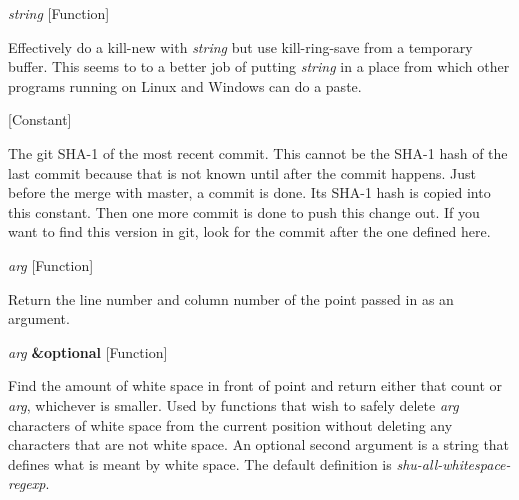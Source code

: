 \vspace{1em}
\noindent
{}
\usebox{\funcname}\emph{string}
 \hfill [Function]

\begin{doc-string}
Effectively do a kill-new with \emph{string} but use kill-ring-save from
a temporary buffer.  This seems to to a better job of putting \emph{string}
in a place from which other programs running on Linux and Windows can
do a paste.
\end{doc-string}

\vspace{1em}
\noindent
{}
\usebox{\funcname}
 \hfill [Constant]

\begin{doc-string}
The git SHA-1 of the most recent commit.  This cannot be the SHA-1 hash of
the last commit because that is not known until after the commit happens.  Just
before the merge with master, a commit is done.  Its SHA-1 hash is copied into
this constant.  Then one more commit is done to push this change out.  If you
want to find this version in git, look for the commit after the one defined
here.
\end{doc-string}

\vspace{1em}
\noindent
{}
\usebox{\funcname}\emph{arg}
 \hfill [Function]

\begin{doc-string}
Return the line number and column number of the point passed in as an argument.
\end{doc-string}

\vspace{1em}
\noindent
{}
\usebox{\funcname}\emph{arg} \textbf{\&optional}
 \hfill [Function]
\hspace*{\wd\funcname}

\begin{doc-string}
Find the amount of white space in front of point and return either that
count or \emph{arg}, whichever is smaller.  Used by functions that wish to
safely delete \emph{arg} characters of white space from the current position
without deleting any characters that are not white space.
An optional second argument is a string that defines what is meant
by white space.  The default definition is \emph{shu-all-whitespace-regexp}.
\end{doc-string}


